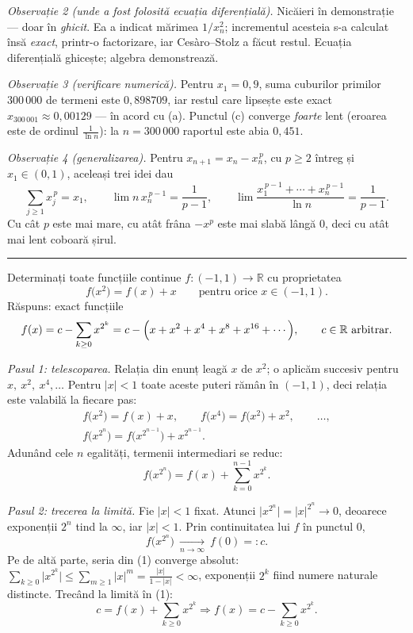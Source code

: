 \emph{Observație 2 (unde a fost folosită ecuația diferențială).} Nicăieri în demonstrație --- doar în \emph{ghicit}. Ea a indicat mărimea $1/x_{n}^{2}$; incrementul acesteia s-a calculat însă \emph{exact}, printr-o factorizare, iar Cesàro--Stolz a făcut restul. Ecuația diferențială ghicește; algebra demonstrează.

\emph{Observație 3 (verificare numerică).} Pentru $x_{1}=0{,}9$, suma cuburilor primilor $300\,000$ de termeni este $0{,}898709$, iar restul care lipsește este exact $x_{300\,001}\approx0{,}00129$ --- în acord cu (a). Punctul (c) converge \emph{foarte} lent (eroarea este de ordinul $\frac{1}{\ln n}$): la $n=300\,000$ raportul este abia $0{,}451$.

\emph{Observație 4 (generalizarea).} Pentru $x_{n+1}=x_{n}-x_{n}^{\,p}$, cu $p\ge2$ întreg și $x_{1}\in(0,1)$, aceleași trei idei dau
\[ \sum_{j\ge1}x_{j}^{\,p}=x_{1},\qquad \lim n\,x_{n}^{\,p-1}=\frac{1}{p-1},\qquad \lim\frac{x_{1}^{\,p-1}+\cdots+x_{n}^{\,p-1}}{\ln n}=\frac{1}{p-1} . \]
Cu cât $p$ este mai mare, cu atât frâna $-x^{p}$ este mai slabă lângă $0$, deci cu atât mai lent coboară șirul.
\vspace{1mm}\hrule

Determinați toate funcțiile continue $f:(-1,1)\to\mathbb{R}$ cu proprietatea
\[ f\bigl(x^{2}\bigr)=f(x)+x\qquad\text{pentru orice }x\in(-1,1) . \]
\sol Răspuns: exact funcțiile
\[ f(x)=c-\sum_{k\ge0}x^{2^{k}}=c-\Bigl(x+x^{2}+x^{4}+x^{8}+x^{16}+\cdots\Bigr),\qquad c\in\mathbb{R}\ \text{arbitrar}. \]

\emph{Pasul 1: telescoparea.} Relația din enunț leagă $x$ de $x^{2}$; o aplicăm succesiv pentru $x,\ x^{2},\ x^{4},\dots$ Pentru $|x|<1$ toate aceste puteri rămân în $(-1,1)$, deci relația este valabilă la fiecare pas:
\[ \begin{gathered} f\bigl(x^{2}\bigr)=f(x)+x,\qquad f\bigl(x^{4}\bigr)=f\bigl(x^{2}\bigr)+x^{2},\qquad \dots,\\ f\bigl(x^{2^{n}}\bigr)=f\bigl(x^{2^{n-1}}\bigr)+x^{2^{n-1}} . \end{gathered} \]
Adunând cele $n$ egalități, termenii intermediari se reduc:
\[ f\bigl(x^{2^{n}}\bigr)=f(x)+\sum_{k=0}^{n-1}x^{2^{k}} . \tag{1} \]

\emph{Pasul 2: trecerea la limită.} Fie $|x|<1$ fixat. Atunci $\bigl|x^{2^{n}}\bigr|=|x|^{2^{n}}\to0$, deoarece exponenții $2^{n}$ tind la $\infty$, iar $|x|<1$. Prin continuitatea lui $f$ în punctul $0$,
\[ f\bigl(x^{2^{n}}\bigr)\ \xrightarrow[n\to\infty]{}\ f(0)=:c . \]
Pe de altă parte, seria din (1) converge absolut: $\sum_{k\ge0}\bigl|x^{2^{k}}\bigr|\le\sum_{m\ge1}|x|^{m}=\frac{|x|}{1-|x|}<\infty$, exponenții $2^{k}$ fiind numere naturale distincte. Trecând la limită în (1):
\[ c=f(x)+\sum_{k\ge0}x^{2^{k}} \Longrightarrow f(x)=c-\sum_{k\ge0}x^{2^{k}} . \]

